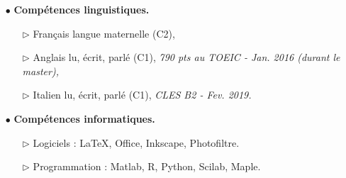 \documentclass[a4paper, 12pt, twoside, openright]{article}
\begin{document}
\begin{enumerate}
\begin{itemize}
{l'imagerie des gliomes de bas grade.}\\ 
Directeurs : Alain Miranville (PR, LMA, Poitiers) et Rémy Guillevin (PU-PH radiologie et imagerie médicale).\\ Rapporteurs : Olivier Saut (DR CNRS, Inria BSO) et Jean Noël-Vallée (PU-PH radiologie et imagerie médicale).\\ Examinateurs : Frédérique Clément (DR, Inria Paris), Jacques Demongeot (PU-PH émérite biostatistiques, informatique médicale et technologies de communication), Jean-Pierre Françoise (PR émérite, LJLL, Paris) et Luc Pellerin (PR biochimie et biologie moléculaire).\\ Invités : Nicolas Bourmeyster (PU-PH biochimie et biologie moléculaire) et Anne-Karine Bouzier-Sore (CR CNRS, spécialité biochimie et biologie moléculaire).
\item[$\triangleright$] \textit{Contrat de DCACE puis vacation, Université de Poitiers, 2017-2020.}\\
Vacation de 64h d'enseignement par an détaillée en section \ref{ens}.
\item[$\triangleright$] \textit{Ingénieur de Recherche - Postdoctorat en mathématiques, CHU de Poitiers, en cours.}\\
Thème : \textit{Etude dynamique du métabolisme énergétique cérébral par la modélisation mathématique.}
\end{itemize}
\vspace{0.3cm}
\item[\color{MagSombre} $\bullet$] \textbf{\color{MagSombre} Compétences linguistiques.}
\begin{itemize}
\item[$\triangleright$] Français langue maternelle (C2),
\item[$\triangleright$] Anglais lu, écrit, parlé (C1),\textit{ 790 pts au TOEIC - Jan. 2016 (durant le master),}
\item[$\triangleright$]  Italien lu, écrit, parlé (C1), \textit{CLES B2 - Fev. 2019.}
\end{itemize}
\vspace{0.3cm}
\item[\color{MagSombre} $\bullet$] \textbf{\color{MagSombre} Compétences informatiques.}
\begin{itemize}
\item[$\triangleright$]Logiciels : \LaTeX , Office, Inkscape, Photofiltre.
\item[$\triangleright$]Programmation : Matlab, R, Python, Scilab, Maple.
\end{itemize}
\end{enumerate}
\end{document}
